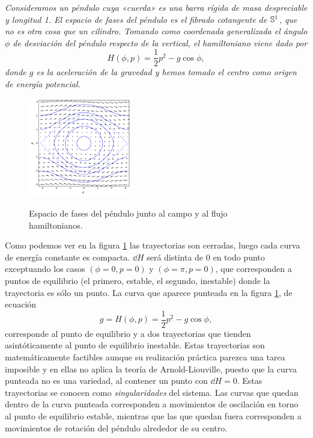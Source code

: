 \begin{ejemplo}
  \em
  Consideramos un péndulo cuya «cuerda» es una barra rígida de masa despreciable y longitud 1. El espacio de fases del péndulo es el fibrado cotangente de $\mathbb{S}^1$, que no es otra cosa que un cilindro. Tomando como coordenada generalizada el ángulo $\phi$ de desviación del péndulo respecto de la vertical, el hamiltoniano viene dado por 
  \begin{equation*}
    H(\phi,p)=\frac{1}{2}p^2 - g\cos\phi,
  \end{equation*}
  donde $g$ es la aceleración de la gravedad y hemos tomado el centro como origen de energía potencial.
  \begin{figure}[h]
    \centering
    \includegraphics[width=0.4\textwidth]{pics/pendulo}
    \label{fig:pendulo}
    \caption{Espacio de fases del péndulo junto al campo y al flujo hamiltonianos.}
  \end{figure}
  Como podemos ver en la figura \ref{fig:pendulo}  las trayectorias son cerradas, luego cada curva de energía constante es compacta. $\dd H$ será distinta de 0 en todo punto exceptuando los casos $(\phi=0,p=0)$ y $(\phi=\pi,p=0)$, que corresponden a puntos de equilibrio (el primero, estable, el segundo, inestable) donde la trayectoria es sólo un punto. La curva que aparece punteada en la figura \ref{fig:pendulo}, de ecuación
  \begin{equation*}
    g=H(\phi,p)=\frac{1}{2}p^2 - g \cos\phi ,
  \end{equation*}
  corresponde al punto de equilibrio y a dos trayectorias que tienden asintóticamente al punto de equilibrio inestable. Estas trayectorias son matemáticamente factibles aunque su realización práctica parezca una tarea imposible y en ellas no aplica la teoría de Arnold-Liouville, puesto que la curva punteada no es una variedad, al contener un punto con $\dd H=0$. Estas trayectorias se conocen como \emph{singularidades} del sistema. Las curvas que quedan dentro de la curva punteada corresponden a movimientos de oscilación en torno al punto de equilibrio estable, mientras que las que quedan fuera corresponden a movimientos de rotación del péndulo alrededor de su centro. 
\end{ejemplo}
